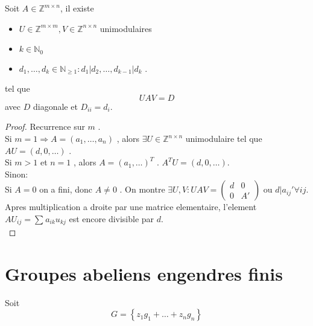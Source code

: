\documentclass[../main.tex]{subfiles}
\begin{document}
\begin{thm}
Soit $A \in \mathbb{Z}^{m \times n}$, il existe
\begin{itemize}
\item $U\in \mathbb{Z}^{m\times m}, V \in \mathbb{Z}^{n\times n}$ unimodulaires
\item $k\in \mathbb{N}_0$ 
\item $ d_1, \ldots, d_k \in \mathbb{N}_{ \geq 1} : d_1 |d_2, \ldots, d_{k-1} | d_k$ .
\end{itemize}
tel que
\[ 
UAV = D
\]
avec $D$ diagonale et $D_{ii} = d_i$.
\end{thm}
\begin{proof}
Recurrence sur $m$ .\\
Si $m=1 \Rightarrow A = ( a_1,\ldots, a_n) $ , alors $\exists U \in \mathbb{Z}^{n\times n}$ unimodulaire tel que $AU = (d, 0, \ldots )$ .\\
Si $m>1$ et $n=1$  , alors $A = ( a_1, \ldots) ^{T}$ . $A^{T}U = ( d,0 , \ldots) $.\\
Sinon:\\
Si $A=0$ on a fini, donc $A \neq 0$ .
On montre $ \exists U,V: UAV =
\begin{pmatrix}
	d & 0\\
	0 & A'
\end{pmatrix} $ ou $d| a_{ij} ' \forall ij$.\\
Apres multiplication a droite par une matrice elementaire, l'element $AU_{ij} = \sum_{}^{ }a_{ik} u_{kj} $ est encore divisible par $d$.\\
\end{proof}
\section{Groupes abeliens engendres finis}
Soit 
\[ 
G = \left\{ z_1 g_1 + \ldots + z_n g_n \right\} 
\]
\end{document}
